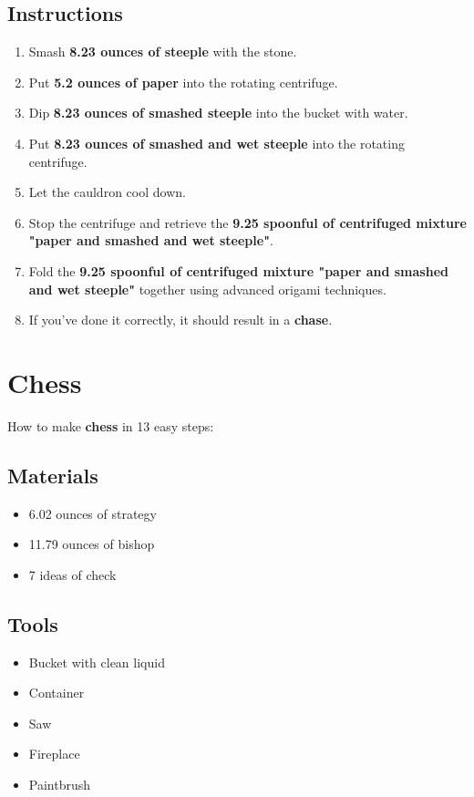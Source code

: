 \documentclass{article}
\begin{document}
\subsection{Instructions}\begin{enumerate}
\item 
Smash \textbf{8.23 ounces of steeple} with the stone.
\item 
Put \textbf{5.2 ounces of paper} into the rotating centrifuge.
\item 
Dip \textbf{8.23 ounces of smashed steeple} into the bucket with water.
\item 
Put \textbf{8.23 ounces of smashed and wet steeple} into the rotating centrifuge.
\item 
Let the cauldron cool down.
\item 
Stop the centrifuge and retrieve the \textbf{9.25 spoonful of centrifuged mixture "paper and smashed and wet steeple"}.
\item 
Fold the \textbf{9.25 spoonful of centrifuged mixture "paper and smashed and wet steeple"} together using advanced origami techniques.
\item 
If you've done it correctly, it should result in a \textbf{chase}.
\end{enumerate}
\newpage
\section{Chess}How to make \textbf{chess} in 13 easy steps:

\subsection{Materials}\begin{itemize}
\item 
6.02 ounces of strategy
\item 
11.79 ounces of bishop
\item 
7 ideas of check
\end{itemize}
\subsection{Tools}\begin{itemize}
\item 
Bucket with clean liquid
\item 
Container
\item 
Saw
\item 
Fireplace
\item 
Paintbrush
\end{itemize}
\end{document}
